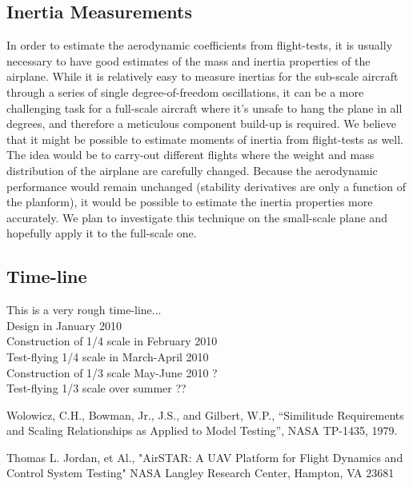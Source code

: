 \documentclass[titlepage,10pt]{article}
\begin{document}
\subsection{Inertia Measurements}
In order to estimate the aerodynamic coefficients from flight-tests, it is usually necessary to have good estimates of the mass and inertia properties of the airplane. While it is relatively easy to measure inertias for the sub-scale aircraft through a series of single degree-of-freedom oscillations, it can be a more challenging task for a full-scale aircraft where it's unsafe to hang the plane in all degrees, and therefore a meticulous component build-up is required.  We believe that it might be possible to estimate moments of inertia from flight-tests as well. The idea would be to carry-out different flights where the weight and mass distribution of the airplane are carefully changed. Because the aerodynamic performance would remain unchanged (stability derivatives are only a function of the planform), it would be possible to estimate the inertia properties more accurately. We plan to investigate this technique on the small-scale plane and hopefully apply it to the full-scale one.\\

\subsection{Time-line}
This is a very rough time-line... \\
Design in January 2010 \\
Construction of 1/4 scale in February 2010 \\
Test-flying 1/4 scale in March-April 2010 \\
Construction of 1/3 scale May-June 2010 ?\\
Test-flying 1/3 scale over summer ?? \\


\begin{thebibliography}{9}

   Wolowicz, C.H., Bowman, Jr., J.S., and Gilbert, W.P.,
   “Similitude Requirements and Scaling Relationships as Applied to Model Testing”, 
   NASA TP-1435, 1979.

Thomas L. Jordan, et Al.,
"AirSTAR: A UAV Platform for Flight Dynamics and Control System Testing"
NASA Langley Research Center, Hampton, VA 23681




\end{thebibliography}
\end{document}
